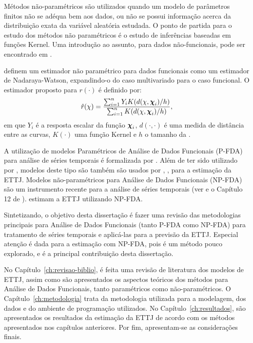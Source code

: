 \documentclass[
	12pt,				%
	openright,			%
	oneside,			%
	a4paper,			%
	english,			%
	brazil				%
	]{dissertacao-ufrgs-abntex2}
\begin{document}
Métodos não-paramétricos são utilizados quando um modelo de parâmetros
finitos não se adéqua bem aos dados, ou não se possui informação acerca
da distribuição exata da variável aleatória estudada. O ponto de partida
para o estudo dos métodos não paramétricos é o estudo de inferências
baseadas em funções Kernel. Uma introdução ao assunto, para dados não-funcionais, pode ser encontrado 
em .

 definem um estimador não paramétrico para dados funcionais como um estimador de Nadaraya-Watson, expandindo-o do caso multivariado para o caso funcional. O estimador proposto para $r(\cdot)$ é definido por:
\begin{equation}
\hat{r}(\chi)=\dfrac{\sum_{i=1}^{n}Y_{i}K(d(\chi,\boldsymbol{\chi}_{i})/h)}{\sum_{i=1}^{n}K(d(\chi,\boldsymbol{\chi}_{i})/h)},
\end{equation}
em que $Y_i$ é a resposta escalar da função $\boldsymbol{\chi}_i$, $d(\cdot,\cdot)$ é uma medida de distância entre as curvas, $K(\cdot)$ uma função Kernel e $h$ o tamanho da \bw.

A utilização de modelos Paramétricos de Análise de Dados Funcionais
(P-FDA) para análise de séries temporais
é formalizada por  .
Além de ter sido utilizado por , modelos deste tipo são também são usados por  ,
, para a estimação da ETTJ.
Modelos não-paramétricos para Análise de Dados Funcionais (NP-FDA) são um instrumento recente para a análise
de séries temporais (ver  e o Capítulo 12 de ).
 estimam a ETTJ utilizando
NP-FDA. %

Sintetizando, o objetivo desta dissertação é fazer uma revisão das metodologias
principais para Análise de Dados Funcionais (tanto P-FDA como NP-FDA)
para tratamento de séries temporais e aplicá-las para a previsão da ETTJ. Especial atenção é dada para a estimação com NP-FDA, pois é um método pouco explorado, e é a principal contribuição desta dissertação.

No Capítulo~\ref{ch:revisao-biblio}, é feita uma revisão de literatura dos modelos de ETTJ, assim como são apresentados os aspectos teóricos dos métodos para Análise de Dados Funcionais, tanto paramétricos como não-paramétricos. 
O Capítulo~\ref{ch:metodologia} trata
da metodologia utilizada para a modelagem, dos dados e do ambiente
de programação utilizados. No Capítulo~\ref{ch:resultados},
são apresentados os resultados da estimação da ETTJ de acordo com os métodos apresentados
nos capítulos anteriores. Por fim, apresentam-se as considerações finais.
\end{document}

